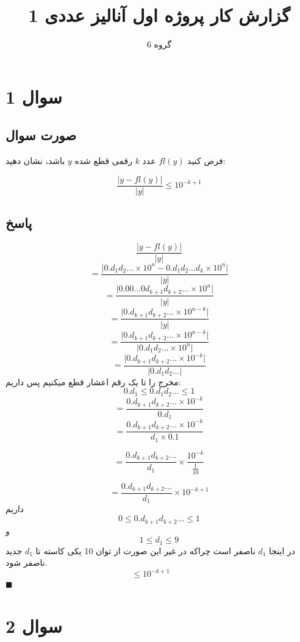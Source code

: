 \documentclass[12pt, letterpaper]{article}
\title{گزارش کار پروژه اول آنالیز عددی 1}
\author{گروه 6}
\begin{document}
\maketitle

\section{سوال 1}
\subsection{صورت سوال}
فرض کنید \(fl(y)\) عدد \(k\) رقمی قطع شده \(y\) باشد، نشان دهید:

\[\frac{\big| y-fl(y) \big| }{\big| y \big|} \le 10^{-k+1}\]

\subsection{پاسخ}


\[ \frac{\big| y-fl(y) \big| }{\big| y \big|}\] 
\[ = \frac{\big| 0.d_{1}d_{2}... \times{10^{n}} - 0.d_{1}d_{2}...d_{k} \times{10^n} \big|}{\big| y \big|} \]
\[ = \frac{\big| 0.00...0d_{k+1}d_{k+2}... \times{10^{n}}   \big|}{\big| y \big|}    \]
\[ = \frac{\big| 0.d_{k+1}d_{k+2}... \times{10^{n-k}}   \big|}{\big| y \big|}    \]
\[ = \frac{\big| 0.d_{k+1}d_{k+2}... \times{10^{n-k}}   \big|}{\big| 0.d_{1}d_{2}... \times{10^n} \big|}    \]
\[ = \frac{\big| 0.d_{k+1}d_{k+2}... \times{10^{-k}}   \big|}{\big| 0.d_{1}d_{2}... \big|}    \]
مخرج را تا یک رقم اعشار قطع میکنیم پس داریم:
\[ 0.d_{1} \le 0.d_{1}d_{2}... \le 1\]
\[ = \frac{0.d_{k+1}d_{k+2}... \times{10^{-k}}}{ 0.d_{1}}  \]
\[ = \frac{0.d_{k+1}d_{k+2}... \times{10^{-k}}}{ d_{1}\times 0.1}  \]

\[ = \frac{0.d_{k+1}d_{k+2}...}{ d_{1}}  \times \frac{ 10^{-k}}{\frac{1}{10}} \]

\[ = \frac{0.d_{k+1}d_{k+2}...}{ d_{1}}  \times 10^{-k+1} \]
داریم 
\[ 0 \le 0.d_{k+1}d_{k+2}... \le 1 \]
و
\[ 1 \le d_{1} \le 9\]
در اینجا $d_{1}$ ناصفر است چراکه در غیر این صورت از توان 10 یکی کاسته تا $d_{1}$ جدید ناصفر شود.
\[ \le 10^{-k+1} \qquad\] 
$\blacksquare$






\vspace{5mm}

\section{سوال 2}
\end{document}
